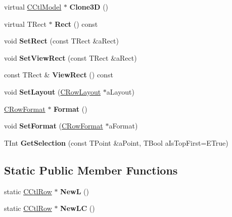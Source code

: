 \begin{DoxyCompactItemize}
virtual \hyperlink{classCCtlModel}{C\+Ctl\+Model} $\ast$ {\bfseries Clone3D} ()
\item 
\mbox{\label{classCCtlRow_a663a9568d7aee3243d4d50d02f52aff2}} 
virtual T\+Rect $\ast$ {\bfseries Rect} () const
\item 
\mbox{\label{classCCtlRow_a36a8453bd1ff2a6edc70b7377e2478ba}} 
void {\bfseries Set\+Rect} (const T\+Rect \&a\+Rect)
\item 
\mbox{\label{classCCtlRow_a2f92c5996bf38f3b564d62476e52324a}} 
void {\bfseries Set\+View\+Rect} (const T\+Rect \&a\+Rect)
\item 
\mbox{\label{classCCtlRow_a619a8ac5af3be217d424e6d9dbb4ad22}} 
const T\+Rect \& {\bfseries View\+Rect} () const
\item 
\mbox{\label{classCCtlRow_a533cdd6ffbd0aaa8ae8d09f5f7ee7895}} 
void {\bfseries Set\+Layout} (\hyperlink{classCRowLayout}{C\+Row\+Layout} $\ast$a\+Layout)
\item 
\mbox{\label{classCCtlRow_a006578f546a71f2d1faed274abfef3bb}} 
\hyperlink{classCRowFormat}{C\+Row\+Format} $\ast$ {\bfseries Format} ()
\item 
\mbox{\label{classCCtlRow_a99a44bff64b591b39908c719b729f088}} 
void {\bfseries Set\+Format} (\hyperlink{classCRowFormat}{C\+Row\+Format} $\ast$a\+Format)
\item 
\mbox{\label{classCCtlRow_a92981b941bd509ffc9fdf2421d96f2ab}} 
T\+Int {\bfseries Get\+Selection} (const T\+Point \&a\+Point, T\+Bool a\+Is\+Top\+First=E\+True)
\end{DoxyCompactItemize}
\subsection*{Static Public Member Functions}
\begin{DoxyCompactItemize}
\item 
\mbox{\label{classCCtlRow_ace17a35f5a1f9c76e24633e4c78de51f}} 
static \hyperlink{classCCtlRow}{C\+Ctl\+Row} $\ast$ {\bfseries NewL} ()
\item 
\mbox{\label{classCCtlRow_a4af427a3a325d3cd389f83d160340b64}} 
static \hyperlink{classCCtlRow}{C\+Ctl\+Row} $\ast$ {\bfseries New\+LC} ()
\end{DoxyCompactItemize}
